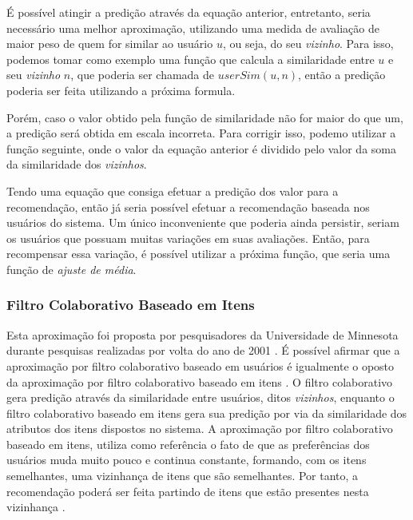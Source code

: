 \documentclass[12pt,
				openright,
				twoside,
				a4paper,
				apter=TITLE,
				section=TITLE,
				subsection=TITLE,
				chapter=TITLE,
				english,
				brazil]{abntex2}
\begin{document}

É possível atingir a predição através da equação anterior, entretanto, seria necessário uma melhor aproximação, utilizando uma medida de avaliação de maior peso de quem for similar ao usuário $u$, ou seja, do seu \textit{vizinho}. Para isso, podemos tomar como exemplo uma função que calcula a similaridade entre $u$ e seu \textit{vizinho} $n$, que poderia ser chamada de $userSim(u,n)$, então a predição poderia ser feita utilizando a próxima formula. 


Porém, caso o valor obtido pela função de similaridade não for maior do que um, a predição será obtida em escala incorreta. Para corrigir isso, podemo utilizar a função seguinte, onde o valor da equação anterior é dividido pelo valor da soma da similaridade dos \textit{vizinhos}.


Tendo uma equação que consiga efetuar a predição dos valor para a recomendação, então já seria possível efetuar a recomendação baseada nos usuários do sistema. Um único inconveniente que poderia ainda persistir, seriam os usuários que possuam muitas variações em suas avaliações. Então, para recompensar essa variação, é possível utilizar a próxima função, que seria uma função de \textit{ajuste de média}.


\subsubsection{Filtro Colaborativo Baseado em Itens}
Esta aproximação foi proposta por pesquisadores da Universidade de Minnesota durante pesquisas realizadas por volta do ano de 2001 \cite{sarwar2001item}. É possível afirmar que a aproximação por filtro colaborativo baseado em usuários é igualmente o oposto da aproximação por filtro colaborativo baseado em itens \cite{schafer2007collaborative}. O filtro colaborativo gera predição através da similaridade entre usuários, ditos \textit{vizinhos}, enquanto o filtro colaborativo baseado em itens gera sua predição por via da similaridade dos atributos dos itens dispostos no sistema. A aproximação por filtro colaborativo baseado em itens, utiliza como referência o fato de que as preferências dos usuários muda muito pouco e continua constante, formando, com os itens semelhantes, uma vizinhança de itens que são semelhantes. Por tanto, a recomendação poderá ser feita partindo de itens que estão presentes nesta vizinhança \cite{asanov2011algorithms}.
\end{document}
